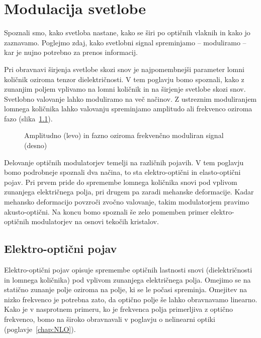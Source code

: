 
\chapter{Modulacija svetlobe}
\label{chap:modulacija}
Spoznali smo, kako svetloba nastane, kako se širi po optičnih vlaknih in kako
jo zaznavamo. Poglejmo zdaj, kako svetlobni signal spreminjamo -- moduliramo -- kar
je nujno potrebno za prenos informacij. 

Pri obravnavi širjenja svetlobe skozi snov je najpomembnejši parameter lomni količnik
oziroma tenzor dielektričnosti. V tem poglavju bomo spoznali, kako z zunanjim poljem vplivamo 
na lomni količnik in na širjenje svetlobe skozi snov. Svetlobno 
valovanje lahko moduliramo na več načinov. Z ustreznim moduliranjem
lomnega količnika lahko valovanju spreminjamo amplitudo 
ali frekvenco oziroma fazo
 (slika~\ref{fig:amfm}). 
\begin{figure}[h]
\centering
\def\svgwidth{140truemm} 

\caption{Amplitudno (levo) in fazno oziroma frekvenčno moduliran signal (desno)
}
\label{fig:amfm}
\end{figure}

Delovanje optičnih modulatorjev temelji na različnih pojavih. V tem poglavju bomo 
podrobneje spoznali dva načina, to sta elektro-optični in elasto-optični pojav. 
Pri prvem pride do spremembe lomnega količnika snovi pod vplivom zunanjega električnega polja, 
pri drugem pa zaradi mehanske deformacije. Kadar mehansko deformacijo povzroči zvočno valovanje, 
takim modulatorjem pravimo akusto-optični. Na koncu bomo spoznali še zelo pomemben 
primer elektro-optičnih modulatorjev na osnovi tekočih kristalov.

\section{Elektro-optični pojav}
\label{chap:EO}
Elektro-optični pojav opisuje spremembe optičnih lastnosti 
snovi (dielektričnosti in lomnega količnika) pod vplivom 
zunanjega električnega polja. Omejimo se na statično zunanje polje oziroma
na polje, ki se le počasi spreminja. Omejitev na nizko 
frekvenco je potrebna zato, da optično polje še lahko obravnavamo linearno. 
Kako je v nasprotnem primeru, ko je frekvenca polja primerljiva z optično frekvenco, 
bomo na široko obravnavali v poglavju o nelinearni optiki (poglavje~\ref{chap:NLO}).

